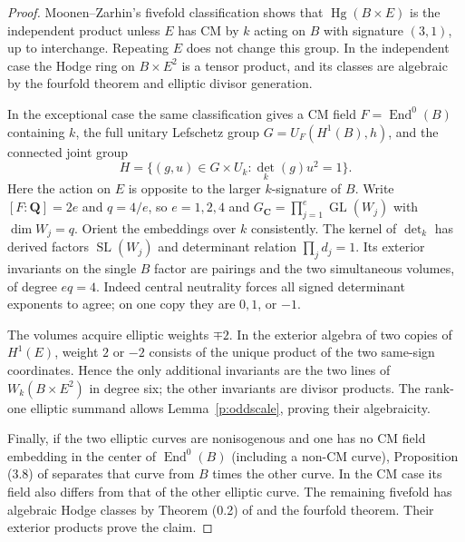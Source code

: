 \documentclass[10pt,reqno]{article}
\theoremstyle{emphasizedplain}
\theoremstyle{emphasizeddefinition}
\theoremstyle{emphasizeddefinition}
\DeclareMathOperator{\End}{End}
\DeclareMathOperator{\Hg}{Hg}
\DeclareMathOperator{\GL}{GL}
\DeclareMathOperator{\SL}{SL}
\newcommand{\Q}{\mathbf Q}
\newcommand{\C}{\mathbf C}
\begin{document}
\begin{proof}
Moonen--Zarhin's fivefold classification
\cite[Theorem (0.2) and \S5.11]{MZ} shows that $\Hg(B\times E)$
is the independent product unless $E$ has CM by $k$ acting on $B$
with signature $(3,1)$, up to interchange. Repeating $E$ does not
change this group. In the independent case the Hodge ring on
$B\times E^2$ is a tensor product, and its classes are algebraic
by the fourfold theorem and elliptic divisor generation.

In the exceptional case the same classification gives a CM field
$F=\End^0(B)$ containing $k$, the full unitary Lefschetz group
$G=U_F(H^1(B),h)$, and the connected joint group
\[
 H=\{(g,u)\in G\times U_k:\det_k(g)u^2=1\}.
\]
Here the action on $E$ is opposite to the larger $k$-signature of $B$.
Write $[F:\Q]=2e$ and $q=4/e$, so $e=1,2,4$ and
$G_\C=\prod_{j=1}^e\GL(W_j)$ with $\dim W_j=q$.
Orient the embeddings over $k$ consistently. The kernel of
$\det_k$ has derived factors $\SL(W_j)$ and determinant relation
$\prod_j d_j=1$. Its exterior invariants on the single $B$ factor
are pairings and the two simultaneous volumes, of degree $eq=4$.
Indeed central neutrality forces all signed determinant exponents
to agree; on one copy they are $0,1$, or $-1$.

The volumes acquire elliptic weights $\mp2$. In the exterior
algebra of two copies of $H^1(E)$, weight $2$ or $-2$ consists of
the unique product of the two same-sign coordinates. Hence the only
additional invariants are the two lines of $W_k(B\times E^2)$ in
degree six; the other invariants are divisor products. The rank-one
elliptic summand allows Lemma~\ref{p:oddscale}, proving their
algebraicity.

Finally, if the two elliptic curves are nonisogenous and one has
no CM field embedding in the center of $\End^0(B)$ (including
a non-CM curve), Proposition (3.8) of \cite{MZ} separates that curve
from $B$ times the other curve. In the CM case its field also differs
from that of the other elliptic curve. The remaining fivefold has
algebraic Hodge classes by Theorem (0.2) of \cite{MZ} and the
fourfold theorem. Their exterior products prove the claim.
\end{proof}
\end{document}
